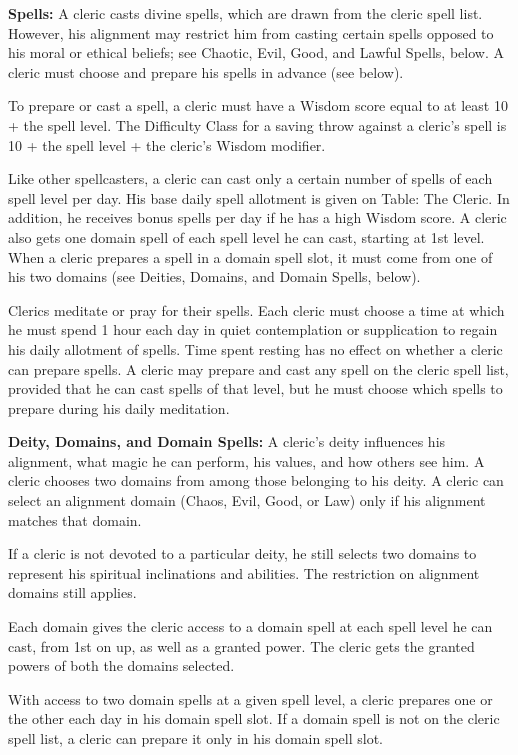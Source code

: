 \documentclass{article}
\begin{document}
\textbf{Spells:} A cleric casts divine spells, which are drawn from the cleric 
spell list. However, his alignment may restrict him from casting certain spells 
opposed to his moral or ethical beliefs; see Chaotic, Evil, Good, and Lawful Spells, 
below. A cleric must choose and prepare his spells in advance (see below).

To prepare or cast a spell, a cleric must have a Wisdom score equal to at least 
10 + the spell level. The Difficulty Class for a saving throw against a cleric's 
spell is 10 + the spell level + the cleric's Wisdom modifier.

Like other spellcasters, a cleric can cast only a certain number of spells of each 
spell level per day. His base daily spell allotment is given on Table: The Cleric. 
In addition, he receives bonus spells per day if he has a high Wisdom score. A 
cleric also gets one domain spell of each spell level he can cast, starting at 
1st level. When a cleric prepares a spell in a domain spell slot, it must come 
from one of his two domains (see Deities, Domains, and Domain Spells, below).

Clerics meditate or pray for their spells. Each cleric must choose a time at which 
he must spend 1 hour each day in quiet contemplation or supplication to regain 
his daily allotment of spells. Time spent resting has no effect on whether a cleric 
can prepare spells. A cleric may prepare and cast any spell on the cleric spell 
list, provided that he can cast spells of that level, but he must choose which 
spells to prepare during his daily meditation.

\textbf{Deity, Domains, and Domain Spells:} A cleric's deity influences his alignment, 
what magic he can perform, his values, and how others see him. A cleric chooses 
two domains from among those belonging to his deity. A cleric can select an alignment 
domain (Chaos, Evil, Good, or Law) only if his alignment matches that domain.

If a cleric is not devoted to a particular deity, he still selects two domains 
to represent his spiritual inclinations and abilities. The restriction on alignment 
domains still applies.

Each domain gives the cleric access to a domain spell at each spell level he can 
cast, from 1st on up, as well as a granted power. The cleric gets the granted powers 
of both the domains selected.

With access to two domain spells at a given spell level, a cleric prepares one 
or the other each day in his domain spell slot. If a domain spell is not on the 
cleric spell list, a cleric can prepare it only in his domain spell slot.
\end{document}
